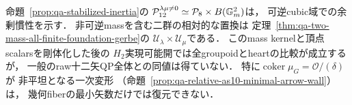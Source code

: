 \begin{remark}[十二矢QPの余剰慣性の範囲]
\label{rem:qa-cubic-qp-remaining-inertia}
命題~\ref{prop:qa-stabilized-inertia}の
$\mathcal P_{12}^{\lambda\mu\ne0}
 \simeq\mathcal P_8\times B(\mathbb G_m^2)$は，
可逆cubic域での余剰慣性を示す．
非可逆massを含む二群の相対的な置換は
定理~\ref{thm:qa-two-mass-all-finite-foundation-gerbe}の
$\mathcal U_\lambda\times\mathcal U_\mu$である．
このmass kernelと頂点scalarsを剛体化した後の
$H_2$実現可能開では全groupoidとheartの比較が成立するが，
一般のraw十二矢QP全体との同値は得ていない．
特に$\operatorname{coker}\mu_G=\mathcal O/(\delta)$が
非平坦となる一次変形
（命題~\ref{prop:qa-relative-as10-minimal-arrow-wall}）は，
幾何fiberの最小矢数だけでは復元できない．
\end{remark}
